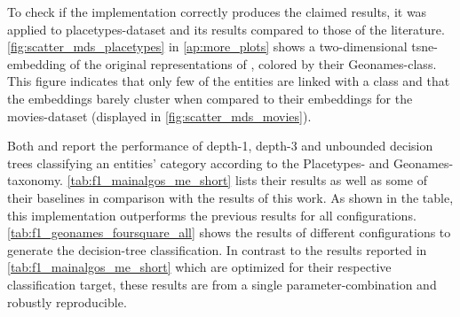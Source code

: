 To check if the implementation correctly produces the claimed results, it was applied to  placetypes-dataset and its results compared to those of the literature. \autoref{fig:scatter_mds_placetypes} in \autoref{ap:more_plots} shows a two-dimensional \gls{tsne}-embedding of the original representations of \cite{Derrac2015}, colored by their Geonames-class. This figure indicates that only few of the entities are linked with a class and that the embeddings barely cluster when compared to their embeddings for the movies-dataset (displayed in \autoref{fig:scatter_mds_movies}). 

Both \cite{Ager2018} and \cite{Alshaikh2020} report the performance of depth-1, depth-3 and unbounded decision trees classifying an entities' category according to the Placetypes- and Geonames-taxonomy. \autoref{tab:f1_mainalgos_me_short} lists their results as well as some of their baselines in comparison with the results of this work. As shown in the table, this implementation outperforms the previous results for all configurations. \autoref{tab:f1_geonames_foursquare_all} shows the results of different configurations to generate the decision-tree classification. In contrast to the results reported in \ref{tab:f1_mainalgos_me_short} which are optimized for their respective classification target, these results are from a single parameter-combination and robustly reproducible. 

